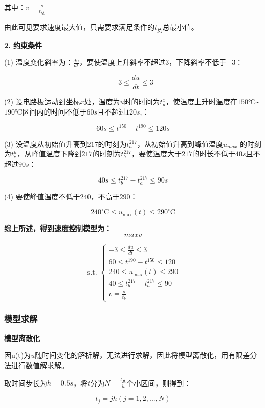 \documentclass[withoutpreface,bwprint]{cumcmthesis} %
\numberwithin{equation}{subsection}
\newcommand{\toper}{\noindent \textbf}
\begin{document}
其中：$v=\frac{s}{t_{\text{总}}}$

由此可见要求速度最大值，只需要求满足条件的$t_{\text{总}}$总最小值。

\toper{2. 约束条件}

\noindent (1) 温度变化斜率为：$\frac{du}{dt}$，要使温度上升斜率不超过$3$，下降斜率不低于$-3$：

$$-3\leq \frac{du}{dt}\leq 3$$

\noindent (2) 设电路板运动到坐标$x$处，温度为$u$时的时间为$t_{u}^{x}$，使温度上升时温度在$150℃$\~{}$190℃$区间内的时间不低于$60s$且不超过$120s$,：

$$60s\leq t^{150}-t^{190}\leq 120s$$

\noindent(3) 设温度从初始值升高到$217$\textcelsius 的时刻为$t_{a}^{217}$，从初始值升高到峰值温度$u_{max}$ 的时刻为$t_{c}^{u}$，从峰值温度下降到$217$\textcelsius 的时刻为$t_{b}^{217}$，要使温度大于$217$\textcelsius 的时长不低于$40𝑠$且不超过$90s$：

$$40s\leq t_{b}^{217}-t_{a}^{217}\leq 90s$$

\noindent (4) 要使峰值温度不低于$240$\textcelsius ，不高于$290$\textcelsius ：

$$
240^{\circ} \mathrm{C} \leq u_{\max }(t) \leq 290^{\circ} \mathrm{C}
$$

\toper{综上所述，得到速度控制模型为：}
$$maxv$$


\begin{equation}
	\text { s.t. }\left\{\begin{array}{l}
		-3 \leq \frac{d u}{d t} \leq 3 \\
		60 \leq t^{190}-t^{150} \leq 120 \\
		240 \leq u_{\max }(t) \leq 290 \\
		40 \leq t_{b}^{217}-t_{a}^{217} \leq 90 \\
		v=\frac{s}{t_{b}}
	\end{array}\right.
\end{equation}

\subsubsection{模型求解}

\toper{模型离散化}

因u(t)为$u$随时间变化的解析解，无法进行求解，因此将模型离散化，用有限差分法进行数值解求解。


取时间步长为$h=0.5s$，将$t$分为$N=\frac{t_{\text{总}}}{h}$个小区间，则得到：

$$t_{j}=jh(j=1,2,...,N)$$
\end{document}
